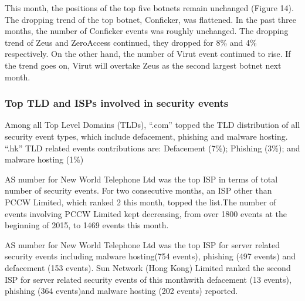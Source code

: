 \documentclass[11pt]{article}
\begin{document}
This month, the positions of the top five botnets remain unchanged (Figure 14).
The dropping trend of the top botnet, Conficker, was flattened. In the past three months, the number of Conficker events was roughly unchanged.
The dropping trend of Zeus and ZeroAccess continued, they dropped for 8\% and 4\% respectively. On the other hand, the number of Virut event continued to rise. If the trend goes on, Virut will overtake Zeus as the second largest botnet next month.
\FloatBarrier
\subsubsection*{Top TLD and ISPs involved in security events}
Among all Top Level Domains (TLDs), “.com” topped the TLD distribution of all security event types, which include defacement, phishing and malware hosting.
“.hk” TLD related events contributions are: Defacement (7\%); Phishing (3\%); and malware hosting (1\%)

AS number for New World Telephone Ltd was the top ISP in terms of total number of security events. For two consecutive months, an ISP other than PCCW Limited, which ranked 2 this month, topped the list.The number of events involving PCCW Limited kept decreasing, from over 1800 events at the beginning of 2015, to 1469 events this month.

AS number for New World Telephone Ltd was the top ISP for server related security events including malware hosting(754 events), phishing (497 events) and defacement (153 events).
Sun Network (Hong Kong) Limited ranked the second ISP for server related security events of this monthwith defacement (13 events), phishing (364 events)and malware hosting (202 events) reported.
\pagebreak
\FloatBarrier
\end{document}
